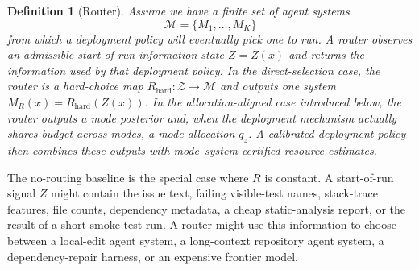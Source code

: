 \documentclass{article}
\newtheorem{definition}{Definition}
\newcommand{\cM}{\mathcal{M}}
\begin{document}
\begin{definition}[Router]
\label{def:router}
Assume we have a finite set of agent systems
\[
    \cM=\{M_1,\ldots,M_K\}
\]
from which a deployment policy will eventually pick one to run.
A router observes an admissible start-of-run information state \(Z=Z(x)\) and returns
the information used by that deployment policy.  In the direct-selection case,
the router is a hard-choice map \(R_{\mathrm{hard}}:\mathcal Z\to\cM\) and outputs
one system \(M_R(x)=R_{\mathrm{hard}}(Z(x))\).  In the allocation-aligned case
introduced below, the router outputs a mode posterior and, when the deployment
mechanism actually shares budget across modes, a mode allocation \(q_z\).  A
calibrated deployment policy then combines these outputs with mode--system
certified-resource estimates.
\end{definition}
The no-routing baseline is the special case where \(R\) is constant.
A start-of-run signal \(Z\) might contain the issue text, failing visible-test names, stack-trace features, file counts, dependency metadata, a cheap static-analysis report, or the result of a short smoke-test run.
A router might use this information to choose between a local-edit agent system, a long-context repository agent system, a dependency-repair harness, or an expensive frontier model.
\end{document}
